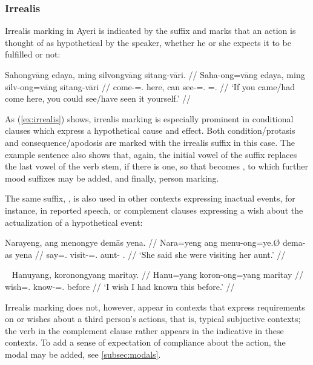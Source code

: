 \subsubsection{Irrealis}

Irrealis marking in Ayeri is indicated by the suffix  and 
marks that an action is thought of as hypothetical by the speaker, whether he 
or she expects it to be fulfilled or not:

\ex\label{ex:irrealis}\begingl
	\gla Sahongvāng edaya, ming silvongvāng sitang-vāri. //
	\glb Saha-ong=vāng edaya, ming silv-ong=vāng sitang-vāri //
	\glb come-\Irr{}=\Ssg{}.\Aarg{} here, can see-\Irr{}=\Ssg{}.\Aarg{} 
		\Refl{}=\Ssg{}.\Ins{} //
	\glft `If you came/had come here, you could see/have seen it  
		yourself.' //
\endgl\xe

As (\ref{ex:irrealis}) shows, irrealis marking is especially prominent in
conditional clauses which express a hypothetical cause and effect. Both
condition/protasis and consequence/apodosis are marked with the irrealis suffix
in this case. The example sentence also shows that, again, the initial vowel of
the suffix replaces the last vowel of the verb stem, if there is one, so that
 becomes , to which further mood
suffixes may be added, and finally, person marking.

The same suffix, , is also used in other contexts expressing 
inactual events, for instance, in reported speech, or complement clauses 
expressing a wish about the actualization of a hypothetical event:

\ex\begingl
	\gla Narayeng, ang menongye demās yena. //
	\glb Nara=yeng ang menu-ong=ye.Ø dema-as yena //
	\glc say=\TsgF{}.\Aarg{} \AgtT{} visit-\Irr{}=\TsgF{}.\Top{} 
		aunt-\Parg{} \TsgF{}.\Gen{} //
	\glft `She said she were visiting her aunt.' //
\endgl\xe

\ex~\begingl
	\gla Hanuyang, koronongyang maritay. //
	\glb Hanu=yang koron-ong=yang maritay //
	\glc wish=\Fsg{}.\Aarg{} know-\Irr{}=\Fsg{}.\Aarg{} before //
	\glft `I wish I had known this before.' //
\endgl\xe

Irrealis marking does not, however, appear in contexts that express
requirements on or wishes about a third person's actions, that is, typical
subjuctive contexts; the verb in the complement clause rather appears in the
indicative in these contexts. To add a sense of expectation of compliance about
the action, the modal  may be added, see
\autoref{subsec:modals}.

